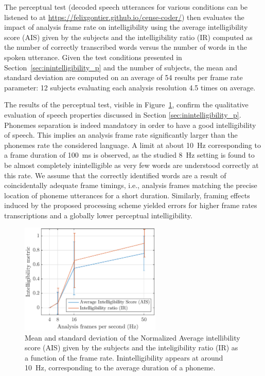 \documentclass[sensors,article,accept,moreauthors,pdftex,10pt,a4paper]{mdpi}
\begin{document}
The perceptual test ({{decoded speech utterances for various conditions can be listened to at} \url{https://felixgontier.github.io/cense-coder/}}) then evaluates the impact of analysis frame rate on intelligibility using the average intelligibility score (AIS) given by the subjects and the intelligibility ratio (IR) computed as the number of correctly transcribed words versus the number of words in the spoken utterance. Given the test conditions presented in Section~\ref{sec:inintelligibility_p} and the number of subjects, the mean and standard deviation are computed on an average of 54 results per frame rate parameter: 12 subjects evaluating each analysis resolution 4.5 times on average.

The results of the perceptual test, visible in Figure~\ref{fig:subj_int}, confirm the qualitative evaluation of speech properties discussed in Section \ref{sec:inintelligibility_p}. Phonemes separation is indeed mandatory in order to have a good intelligibility of speech. This implies an analysis frame rate significantly larger than the phonemes rate the considered language. A limit at about 10~Hz corresponding to a frame duration of 100~ms is observed, as the studied 8~Hz setting is found to be almost completely inintelligible as very few words are understood correctly at this rate. We assume that the correctly identified words are a result of coincidentally adequate frame timings, i.e., analysis frames matching the precise location of phoneme utterances for a short duration. Similarly, framing effects induced by the proposed processing scheme yielded errors for higher frame rates transcriptions and a globally lower perceptual intelligibility.
\vspace{-6pt}
\begin{figure}[H]
	\centering
		\includegraphics[width=0.6\textwidth]{figures/subj_int.eps}
	\caption{Mean and standard deviation of the Normalized Average intellibility score (AIS) given by the subjects and the inteligibility ratio (IR) as a function of the frame rate. Inintelligibility appears at around 10~Hz, corresponding to the average duration of a phoneme.}
	\label{fig:subj_int}
\end{figure}
\end{document}
